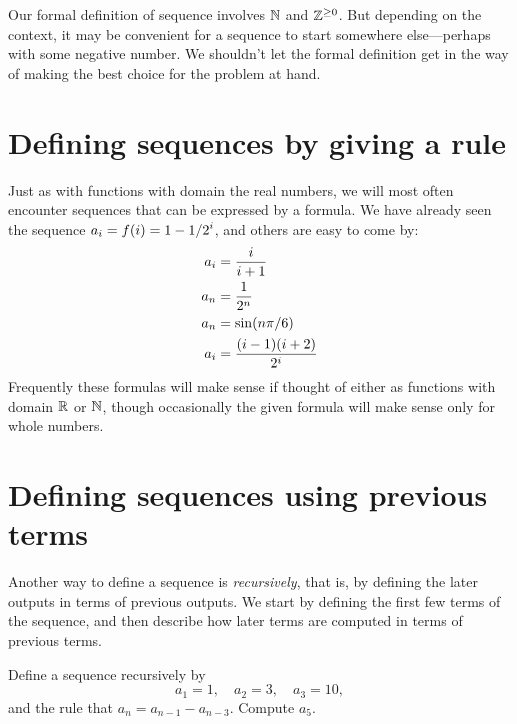 

\begin{warning}
  Our formal definition of sequence involves $\mathbb{N}$ and $\mathbb{Z}^{\ge 0}$.
  But depending on the context, it may be convenient for a sequence to
  start somewhere else---perhaps with some negative number.  We
  shouldn't let the formal definition get in the way of making the
  best choice for the problem at hand.
\end{warning}

\section{Defining sequences by giving a rule}

Just as with functions with domain the real numbers, we will most often
encounter sequences that can be expressed by a formula.  We have
already seen the sequence $\displaystyle a_i=f(i)=1-1/2^i$, and others are easy
to come by:
\begin{align*}
  a_i &={i\over i+1} \\
  a_n &={1\over2^n} \\
  a_n &=\sin(n\pi/6) \\
  a_i &={(i-1)(i+2)\over2^i} \\
\end{align*}
Frequently these formulas will make sense if thought of either as
functions with domain $\mathbb{R}$ or $\mathbb{N}$, though occasionally the given
formula will make sense only for whole numbers.

\section{Defining sequences using previous terms}


Another way to define a sequence is \textit{recursively}, that is, by
defining the later outputs in terms of previous outputs.  We start by
defining the first few terms of the sequence, and then describe how
later terms are computed in terms of previous terms.

\begin{example}
Define a sequence recursively by
$$
a_1 = 1, \quad a_2 = 3, \quad a_3 = 10,
$$
and the rule that $a_n = a_{n-1} - a_{n-3}$.  Compute $a_5$.
\end{example}

